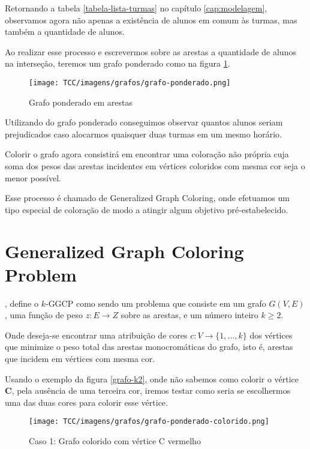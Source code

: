 Retornando a tabela \ref{tabela-lista-turmas} no capítulo \ref{cap:modelagem}, observamos agora não apenas a existência de alunos em comum às turmas, mas também a quantidade de alunos.

Ao realizar esse processo e escrevermos sobre as arestas a quantidade de alunos na interseção, teremos um grafo ponderado como na figura \ref{grafo-ponderado1}.

\begin{figure}[H]
     \centering
     \texttt{[image: TCC/imagens/grafos/grafo-ponderado.png]}
     \caption{Grafo ponderado em arestas}
     \label{grafo-ponderado1}
\end{figure}


Utilizando do grafo ponderado conseguimos observar quantos alunos seriam prejudicados caso alocarmos quaisquer duas turmas em um mesmo horário. 

Colorir o grafo agora consistirá em encontrar uma coloração não própria cuja soma dos pesos das arestas incidentes em vértices coloridos com mesma cor seja o menor possível.  

Esse processo é chamado de {Generalized Graph Coloring}, onde efetuamos um tipo especial de coloração de modo a atingir algum objetivo pré-estabelecido.




\section{Generalized Graph Coloring Problem}

\begin{definition} 
 , define o $k$-GGCP como sendo um problema que consiste em um grafo $G(V, E)$, uma função de peso $z:E \rightarrow  Z$ sobre as arestas, e um número inteiro $k \geq 2$.

Onde deseja-se encontrar uma atribuição de cores $c:V \rightarrow  \{1, ..., k\}$ dos vértices que minimize o peso total das arestas monocromáticas do grafo, isto é, arestas que incidem em vértices com mesma cor.

\end{definition}

Usando o exemplo da figura \ref{grafo-k2}, onde não sabemos como colorir o vértice \textbf{C}, pela ausência de uma terceira cor, iremos testar como seria se escolhermos uma das duas cores para colorir esse vértice.

\begin{figure}[H]
     \centering
     \texttt{[image: TCC/imagens/grafos/grafo-ponderado-colorido.png]}
     \caption{Caso 1: Grafo colorido com vértice C vermelho}
     \label{grafo-ponderado-colorido1}
\end{figure}



